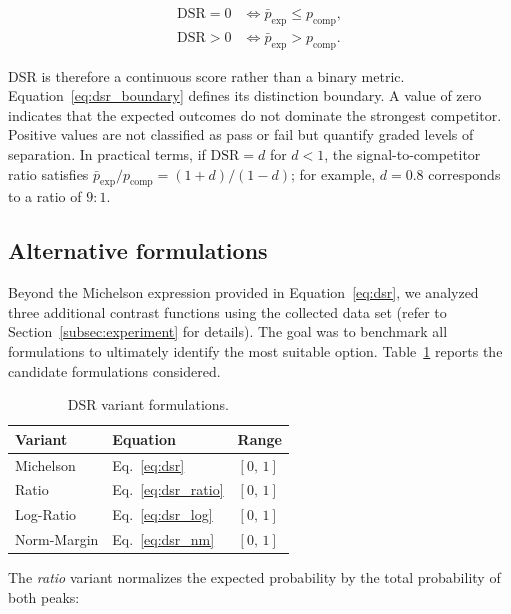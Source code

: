 \documentclass[10pt,conference]{IEEEtran}
\begin{document}
\begin{equation}
\label{eq:dsr_boundary}
\begin{aligned}
\mathrm{DSR}=0
&\iff \bar{p}_{\mathrm{exp}} \leq p_{\mathrm{comp}},\\
\mathrm{DSR}>0
&\iff \bar{p}_{\mathrm{exp}} > p_{\mathrm{comp}}.
\end{aligned}
\end{equation}

DSR is therefore a continuous score rather than a binary metric. Equation~\eqref{eq:dsr_boundary} defines its distinction boundary. A value of zero indicates that the expected outcomes do not dominate the strongest competitor. Positive values are not classified as pass or fail but quantify graded levels of separation. In practical terms, if $\mathrm{DSR}=d$ for $d<1$, the signal-to-competitor ratio satisfies $\bar{p}_{\mathrm{exp}}/p_{\mathrm{comp}}=(1+d)/(1-d)$; for example, $d=0.8$ corresponds to a ratio of $9{:}1$.

\subsection{Alternative formulations}

Beyond the Michelson expression provided in Equation~\eqref{eq:dsr}, we analyzed three additional contrast functions using the collected data set (refer to Section~\ref{subsec:experiment} for details). The goal was to benchmark all formulations to ultimately identify the most suitable option. Table~\ref{tab:dsr_variants} reports the candidate formulations considered.

\begin{table}[ht!]
\centering
\caption{DSR variant formulations.}
\label{tab:dsr_variants}
\begin{tabular}{lll}
\hline
\textbf{Variant} & \textbf{Equation} & \textbf{Range} \\
\hline
Michelson       & Eq.~\eqref{eq:dsr}       & $[0,\,1]$ \\
Ratio           & Eq.~\eqref{eq:dsr_ratio}  & $[0,\,1]$ \\
Log-Ratio       & Eq.~\eqref{eq:dsr_log}    & $[0,\,1]$ \\
Norm-Margin     & Eq.~\eqref{eq:dsr_nm}     & $[0,\,1]$ \\
\hline
\end{tabular}
\end{table}

The \emph{ratio} variant normalizes the expected probability by the total probability of both peaks:
\end{document}
